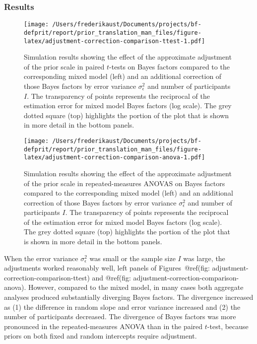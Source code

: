 \documentclass[
  man,floatsintext,draftall]{apa6}
\begin{document}
\hypertarget{results-1}{%
\subsubsection{Results}\label{results-1}}



\begin{figure}
\centering
\texttt{[image: /Users/frederikaust/Documents/projects/bf-defprit/report/prior\_translation\_man\_files/figure-latex/adjustment-correction-comparison-ttest-1.pdf]}
\caption{\label{fig:adjustment-correction-comparison-ttest}Simulation results showing the effect of the approximate adjustment of the prior scale in paired \(t\)-tests on Bayes factors compared to the corresponding mixed model (left) and an additional correction of those Bayes factors by error variance \(\sigma_\epsilon^2\) and number of participants \(I\). The transparency of points represents the reciprocal of the estimation error for mixed model Bayes factors (log scale). The grey dotted square (top) highlights the portion of the plot that is shown in more detail in the bottom panels.}
\end{figure}



\begin{figure}
\centering
\texttt{[image: /Users/frederikaust/Documents/projects/bf-defprit/report/prior\_translation\_man\_files/figure-latex/adjustment-correction-comparison-anova-1.pdf]}
\caption{\label{fig:adjustment-correction-comparison-anova}Simulation results showing the effect of the approximate adjustment of the prior scale in repeated-measures ANOVAS on Bayes factors compared to the corresponding mixed model (left) and an additional correction of those Bayes factors by error variance \(\sigma_\epsilon^2\) and number of participants \(I\). The transparency of points represents the reciprocal of the estimation error for mixed model Bayes factors (log scale). The grey dotted square (top) highlights the portion of the plot that is shown in more detail in the bottom panels.}
\end{figure}

When the error variance \(\sigma_\epsilon^2\) was small or the sample size \(I\) was large, the adjustments worked reasonably well, left panels of Figures~@ref(fig: adjustment-correction-comparison-ttest) and @ref(fig: adjustment-correction-comparison-anova).
However, compared to the mixed model, in many cases both aggregate analyses produced substantially diverging Bayes factors.
The divergence increased as (1) the difference in random slope and error variance increased and (2) the number of participants decreased.
The divergence of Bayes factors was more pronounced in the repeated-measures ANOVA than in the paired \(t\)-test, because priors on both fixed and random intercepts require adjustment.
\end{document}
